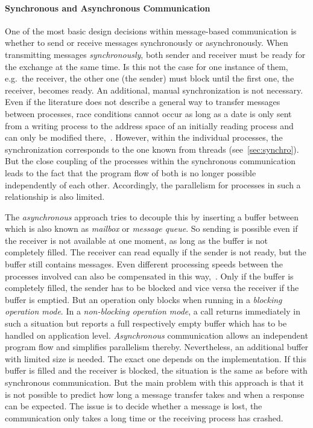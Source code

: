\paragraph{Synchronous and Asynchronous Communication}
One of the most basic design decisions within message-based communication is whether to send or receive messages synchronously or asynchronously.
When transmitting messages \textit{synchronously}, both sender and receiver must be ready for the exchange at the same time\cite{glatz2015betriebssysteme}.
Is this not the case for one instance of them, e.g.\ the receiver, the other one (the sender) must block until the first one, the receiver, becomes ready.
An additional, manual synchronization is not necessary.
Even if the literature does not describe a general way to transfer messages between processes, race conditions cannot occur as long as a date is only sent from a writing process to the address space of an initially reading process and can only be modified there\cite{brause2017betriebssysteme},~\cite{glatz2015betriebssysteme}.
However, within the individual processes, the synchronization corresponds to the one known from threads (see~\ref{sec:synchro}).
But the close coupling of the processes within the synchronous communication leads to the fact that the program flow of both is no longer possible independently of each other.
Accordingly, the parallelism for processes in such a relationship is also limited\cite{brause2017betriebssysteme}.

The \textit{asynchronous} approach tries to decouple this by inserting a buffer between which is also known as \textit{mailbox} or \textit{message queue}.
So sending is possible even if the receiver is not available at one moment, as long as the buffer is not completely filled.
The receiver can read equally if the sender is not ready, but the buffer still contains messages.
Even different processing speeds between the processes involved can also be compensated in this way\cite{glatz2015betriebssysteme},~\cite{brause2017betriebssysteme}.
Only if the buffer is completely filled, the sender has to be blocked and vice versa the receiver if the buffer is emptied.
But an operation only blocks when running in a \textit{blocking operation mode}.
In a \textit{non-blocking operation mode}, a call returns immediately in such a situation but reports a full respectively empty buffer which has to be handled on application level\cite{glatz2015betriebssysteme}.
\textit{Asynchronous} communication allows an independent program flow and simplifies parallelism thereby.
Nevertheless, an additional buffer with limited size is needed.
The exact one depends on the implementation.
If this buffer is filled and the receiver is blocked, the situation is the same as before with synchronous communication.
But the main problem with this approach is that it is not possible to predict how long a message transfer takes and when a response can be expected\cite{glatz2015betriebssysteme}.
The issue is to decide whether a message is lost, the communication only takes a long time or the receiving process has crashed\cite{tanenbaum-modern-operating-systems}.

